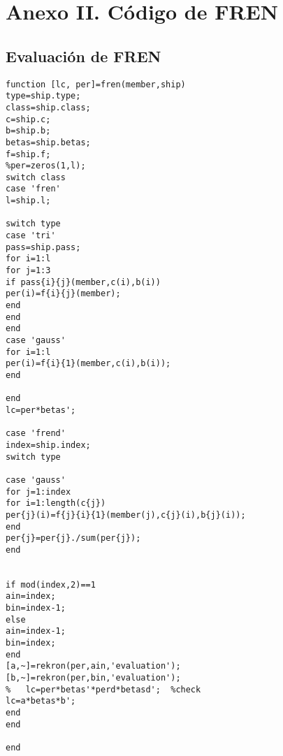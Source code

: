 \section{Anexo II. Código de FREN}\label{FRENcode}

\subsection{Evaluación de FREN}
\begin{lstlisting}
function [lc, per]=fren(member,ship)
type=ship.type;
class=ship.class;
c=ship.c;
b=ship.b;
betas=ship.betas;
f=ship.f;
%per=zeros(1,l);
switch class
case 'fren'
l=ship.l;

switch type
case 'tri'
pass=ship.pass;
for i=1:l
for j=1:3
if pass{i}{j}(member,c(i),b(i))
per(i)=f{i}{j}(member);
end
end
end
case 'gauss'
for i=1:l
per(i)=f{i}{1}(member,c(i),b(i));
end

end
lc=per*betas';

case 'frend'
index=ship.index;
switch type

case 'gauss'
for j=1:index
for i=1:length(c{j})
per{j}(i)=f{j}{i}{1}(member(j),c{j}(i),b{j}(i));
end 
per{j}=per{j}./sum(per{j});
end


if mod(index,2)==1
ain=index;
bin=index-1;
else
ain=index-1;
bin=index;
end
[a,~]=rekron(per,ain,'evaluation');
[b,~]=rekron(per,bin,'evaluation');
%   lc=per*betas'*perd*betasd';  %check
lc=a*betas*b';
end
end

end
\end{lstlisting}


